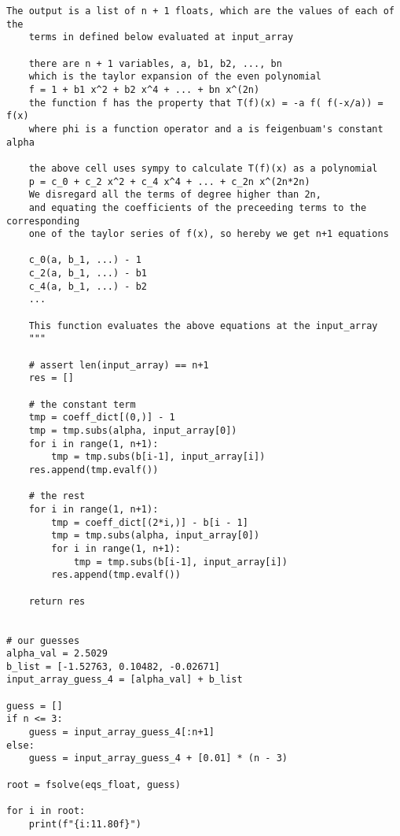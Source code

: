 \begin{lstlisting}[style=python]
    The output is a list of n + 1 floats, which are the values of each of the
    terms in defined below evaluated at input_array

    there are n + 1 variables, a, b1, b2, ..., bn
    which is the taylor expansion of the even polynomial
    f = 1 + b1 x^2 + b2 x^4 + ... + bn x^(2n)
    the function f has the property that T(f)(x) = -a f( f(-x/a)) = f(x)
    where phi is a function operator and a is feigenbuam's constant alpha

    the above cell uses sympy to calculate T(f)(x) as a polynomial
    p = c_0 + c_2 x^2 + c_4 x^4 + ... + c_2n x^(2n*2n)
    We disregard all the terms of degree higher than 2n,
    and equating the coefficients of the preceeding terms to the corresponding
    one of the taylor series of f(x), so hereby we get n+1 equations 

    c_0(a, b_1, ...) - 1 
    c_2(a, b_1, ...) - b1 
    c_4(a, b_1, ...) - b2
    ...

    This function evaluates the above equations at the input_array
    """

    # assert len(input_array) == n+1
    res = []

    # the constant term
    tmp = coeff_dict[(0,)] - 1
    tmp = tmp.subs(alpha, input_array[0])
    for i in range(1, n+1):
        tmp = tmp.subs(b[i-1], input_array[i])
    res.append(tmp.evalf())

    # the rest
    for i in range(1, n+1):
        tmp = coeff_dict[(2*i,)] - b[i - 1]
        tmp = tmp.subs(alpha, input_array[0])
        for i in range(1, n+1):
            tmp = tmp.subs(b[i-1], input_array[i])
        res.append(tmp.evalf())

    return res


# our guesses
alpha_val = 2.5029
b_list = [-1.52763, 0.10482, -0.02671]
input_array_guess_4 = [alpha_val] + b_list

guess = []
if n <= 3:
    guess = input_array_guess_4[:n+1]
else:
    guess = input_array_guess_4 + [0.01] * (n - 3)

root = fsolve(eqs_float, guess)

for i in root:
    print(f"{i:11.80f}")
\end{lstlisting}
